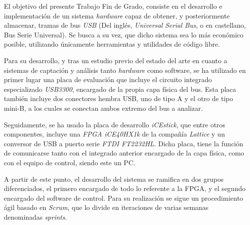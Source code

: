 \begin{resumen}

El objetivo del presente Trabajo Fin de Grado, consiste en el desarrollo e implementación de un sistema \emph{hardware} capaz de obtener, y posteriormente almacenar, tramas de bus \emph{USB} (Del inglés, \emph{Universal Serial Bus}, o en castellano, Bus Serie Universal). Se busca a su vez, que dicho sistema sea lo más económico posible, utilizando únicamente herramientas y utilidades de código libre.

Para su desarrollo, y tras un estudio previo del estado del arte en cuanto a sistemas de captación y análisis tanto \emph{hardware} como software, se ha utilizado en primer lugar una placa de evaluación que incluye el circuito integrado especializado \emph{USB3300}, encargado de la propia capa física del bus. Esta placa también incluye dos conectores hembra USB, uno de tipo A y el otro de tipo mini-B, a los cuales se conectan ambos extremo del bus a analizar.

Seguidamente, se ha usado la placa de desarrollo \emph{iCEstick}, que entre otros componentes, incluye una \emph{FPGA iCE40HX1k} de la compañía \emph{Lattice} y un conversor de USB a puerto serie \emph{FTDI FT2232HL}. Dicha placa, tiene la función de comunicarse tanto con el integrado anterior encargado de la capa física, como con el equipo de control, siendo este un PC.

A partir de este punto, el desarrollo del sistema se ramifica en dos grupos diferenciados, el primero encargado de todo lo referente a la FPGA, y el segundo encargado del software de control. Para su realización se sigue un procedimiento ágil basado en \emph{Scrum}, que lo divide en iteraciones de varias semanas denominadas \emph{sprints}.


\end{resumen}
